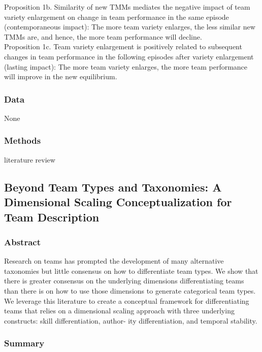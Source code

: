 \documentclass[12pt]{article}
\begin{document}
Proposition 1b. Similarity of new TMMs mediates the negative impact of team variety enlargement on change in team performance in the same episode (contemporaneous impact): The more team variety enlarges, the less similar new TMMs are, and hence, the more team performance will decline. \\

Proposition 1c. Team variety enlargement is positively related to subsequent changes in team performance in the following episodes after variety enlargement (lasting impact): The more team variety enlarges, the more team performance will improve in the new equilibrium.


\subsubsection*{Data}

None

\subsubsection*{Methods}

literature review

\subsection*{Beyond Team Types and Taxonomies: A Dimensional Scaling Conceptualization for Team Description\cite{team_description}}

\subsubsection*{Abstract}

Research on teams has prompted the development of many alternative taxonomies but little consensus on how to differentiate team types. We show that there is greater consensus on the underlying dimensions differentiating teams than there is on how to use those dimensions to generate categorical team types. We leverage this literature to create a conceptual framework for differentiating teams that relies on a dimensional scaling approach with three underlying constructs: skill differentiation, author- ity differentiation, and temporal stability.

\subsubsection*{Summary}
\end{document}
